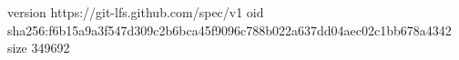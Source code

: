 version https://git-lfs.github.com/spec/v1
oid sha256:f6b15a9a3f547d309c2b6bca45f9096c788b022a637dd04aec02c1bb678a4342
size 349692

